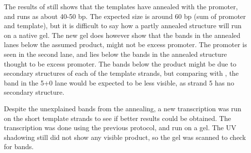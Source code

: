 The results of  still shows that the templates have annealed with the promoter, and runs as about 40-50 bp. The expected size is around 60 bp (sum of promoter and template), but it is difficult to say how a partly annealed structure will run on a native gel. The new gel does however show that the bands in the annealed lanes below the assumed product, might not be excess promoter. The promoter is seen in the second lane, and lies below the bands in the annealed structure thought to be excess promoter. The bands below the product might be due to secondary structures of each of the template strands, but comparing with , the band in the 5+0 lane would be expected to be less visible, as strand 5 has no secondary structure.

Despite the unexplained bands from the annealing, a new transcription was run on the short template strands to see if better results could be obtained. The transcription was done using the previous protocol, and run on a gel. The UV shadowing still did not show any visible product, so the gel was scanned to check for bands.

